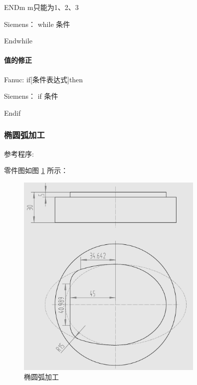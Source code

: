 ENDm    m只能为1、2、3

Siemens： while 条件

Endwhile 

\paragraph{值的修正}

Fanuc:  if[条件表达式]then

Siemens： if  条件

Endif

\subsubsection{椭圆弧加工}
参考程序:

零件图如图 \ref{椭圆弧加工} 所示：

	\begin{figure}[!hbtp]
\centering	\includegraphics[width=0.8\textwidth]{images/5-1.jpg}
	\caption{椭圆弧加工} \label{椭圆弧加工}
\end{figure}


